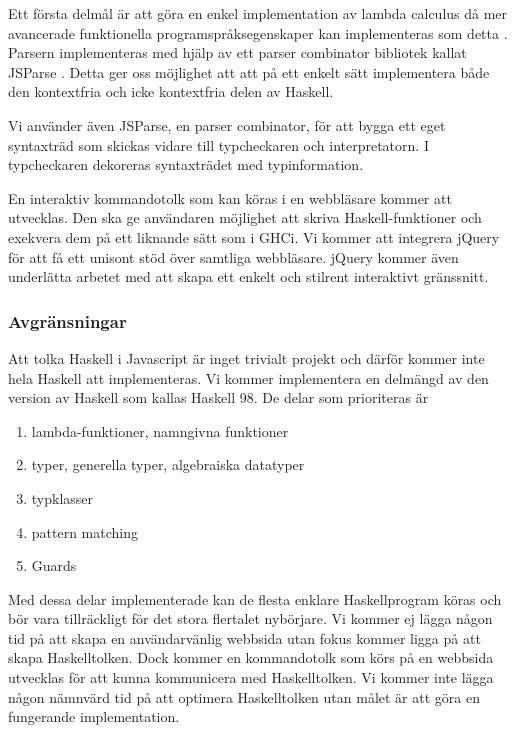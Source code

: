 Ett första delmål är att göra en enkel implementation av lambda calculus då mer avancerade funktionella programspråksegenskaper kan implementeras som detta \citep{jones87}.
 Parsern implementeras med hjälp av ett parser combinator bibliotek kallat JSParse \citep{jsparse}. Detta ger oss möjlighet att att på ett enkelt sätt implementera både den kontextfria och icke kontextfria delen av Haskell.

Vi använder även JSParse, en parser combinator, för att bygga ett eget syntaxträd som skickas vidare till typcheckaren och interpretatorn. I typcheckaren dekoreras syntaxträdet med typinformation.

En interaktiv kommandotolk som kan köras i en webbläsare kommer att utvecklas. Den ska ge användaren möjlighet att skriva Haskell-funktioner och exekvera dem på ett liknande sätt som i GHCi. 
Vi kommer att integrera jQuery \citep{jquery} för att få ett unisont stöd över samtliga webbläsare. jQuery kommer även underlätta arbetet med att skapa ett enkelt och stilrent interaktivt gränssnitt.

\subsubsection{Avgränsningar} 
Att tolka Haskell i Javascript är inget trivialt projekt och därför kommer inte hela Haskell att implementeras. Vi kommer implementera en delmängd av den version av Haskell som kallas Haskell 98.
De delar som prioriteras är
        \begin{enumerate}
            \item{lambda-funktioner, namngivna funktioner}
            \item{typer, generella typer, algebraiska datatyper}
            \item{typklasser}
            \item{pattern matching}
            \item{Guards}
        \end{enumerate}
Med dessa delar implementerade kan de flesta enklare Haskellprogram köras och bör vara tillräckligt för det stora flertalet nybörjare. Vi kommer ej lägga någon tid på att skapa en användarvänlig webbsida utan fokus kommer ligga på att skapa Haskelltolken. Dock kommer en kommandotolk som körs på en webbsida utvecklas för att kunna kommunicera med Haskelltolken. 
Vi kommer inte lägga någon nämnvärd tid på att optimera Haskelltolken utan målet är att göra en fungerande implementation. 

